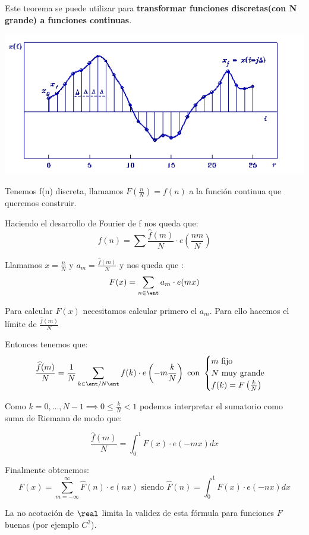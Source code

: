 Este teorema se puede utilizar para \textbf{transformar funciones discretas(con N grande) a funciones continuas}.

\begin{center}
\includegraphics[width=\linewidth]{img/fourier_discreta_a_continua.png}
\end{center}

Tenemos f(n) discreta, llamamos $F\left(\frac{n}{N}\right) = f(n)$ a la función continua que queremos construir.


Haciendo el desarrollo de Fourier de f nos queda que:
$$f(n) = \sum \frac{\widehat{f}(m)}{N} \cdot e\left(\frac{nm}{N}\right)$$

Llamamos $x = \frac{n}{N}$ y $a_m= \frac{\widehat{f}(m)}{N}$ y nos queda que :
$$F(x) = \sum_{n\in \ent } a_m \cdot e(mx)$$

Para calcular $F(x)$ necesitamos calcular primero el $a_m$. Para ello hacemos el límite de $\frac{\widehat{f}(m)}{N}$

Entonces tenemos que:
$$\frac{\widehat{f}(m)}{N} = \frac{1}{N} \sum_{k \in \ent/N\ent} f(k) \cdot e\left(-m \frac{k}{N}\right) \text{ con } \begin{cases}
	m \text{ fijo}\\
	N \text{ muy grande}\\
	f(k) = F\left(\frac{k}{N}\right)\\
\end{cases}$$

Como $ k = 0 , \ldots , N-1 \implies 0\leq \frac{k}{N} < 1$ podemos interpretar el sumatorio como suma de Riemann de modo que:

$$\frac{\widehat{f}(m)}{N} = \int_{0}^{1} F(x) \cdot e(-mx) dx$$

Finalmente obtenemos:
$$F(x) = \sum_{m= -\infty}^{\infty} \widehat{F}(n) \cdot e(nx) \text{ siendo } \widehat{F}(n) = \int_{0}^{1} F(x) \cdot e(-nx) dx$$

\obs La no acotación de $\real$ limita la validez de esta fórmula para funciones $F$  buenas (por ejemplo $C^2$).



